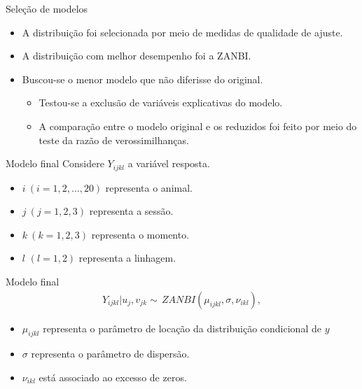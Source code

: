 \documentclass[
  ignorenonframetext,
  serif,
  professionalfont,
  usenames,
  dvipsnames,
  aspectratio = 169]{beamer}
\providecommand{\tightlist}{%
  \setlength{\itemsep}{0pt}\setlength{\parskip}{0pt}}
\renewcommand{\tightlist}{%
  \setlength{\itemsep}{0\baselineskip}
  \setlength{\parskip}{0.25\baselineskip}
}
\begin{document}
\begin{frame}{Seleção de modelos}
\protect\hypertarget{seleuxe7uxe3o-de-modelos}{}
\begin{itemize}
\item
  A distribuição foi selecionada por meio de medidas de qualidade de
  ajuste.
\item
  A distribuição com melhor desempenho foi a ZANBI.
\item
  Buscou-se o menor modelo que não diferisse do original.

  \begin{itemize}
  \tightlist
  \item
    Testou-se a exclusão de variáveis explicativas do modelo.
  \item
    A comparação entre o modelo original e os reduzidos foi feito por
    meio do teste da razão de verossimilhanças.
  \end{itemize}
\end{itemize}
\end{frame}

\begin{frame}{Modelo final}
\protect\hypertarget{modelo-final}{}
Considere \(Y_{ijkl}\) a variável resposta.

\begin{itemize}
\item
  \(i\ (i=1,2,\ldots,20)\) representa o animal.
\item
  \(j\ (j=1,2,3)\) representa a sessão.
\item
  \(k\ (k=1,2,3)\) representa o momento.
\item
  \(l\) \((l=1,2)\) representa a linhagem.
\end{itemize}
\end{frame}

\begin{frame}{Modelo final}
\protect\hypertarget{modelo-final-1}{}
\begin{equation}
    \begin{aligned}
        Y_{ijkl}|u_{j},v_{jk} \sim\,  ZANBI(\mu_{ijkl}, \sigma, \nu_{ikl}),
    \end{aligned}
    \label{eq.model.geral}
\end{equation}

\begin{itemize}
\item
  \(\mu_{ijkl}\) representa o parâmetro de locação da distribuição
  condicional de \(y\)
\item
  \(\sigma\) representa o parâmetro de dispersão.
\item
  \(\nu_{ikl}\) está associado ao excesso de zeros.
\end{itemize}
\end{frame}
\end{document}
